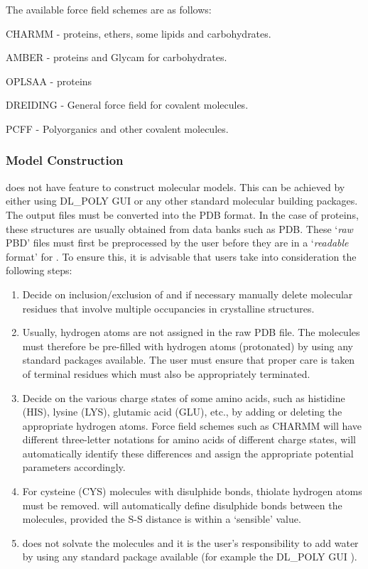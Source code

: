 The available force field schemes are as follows:

CHARMM - proteins, ethers, some lipids and carbohydrates.

AMBER - proteins and Glycam for carbohydrates.

OPLSAA - proteins

DREIDING - General force field for covalent molecules.

PCFF - Polyorganics and other covalent molecules.

\subsubsection*{Model Construction}

\F does not have feature to construct molecular models.  This can be
achieved by either using DL\_POLY GUI \cite{smith-gui} or any
other standard molecular building packages.  The output files must be
converted into the PDB format.  In the case of proteins, these structures
are usually obtained from data banks such as PDB.  These ‘{\em raw} PBD’
files must first be preprocessed by the user before they are in a
‘{\em readable} format’ for \F.  To ensure this, it is advisable that
users take into consideration the following steps:
\begin{enumerate}
\item Decide on inclusion/exclusion of and if necessary manually delete
molecular residues that involve multiple occupancies in crystalline structures.
\item Usually, hydrogen atoms are not assigned in the raw PDB file.
The molecules must therefore be pre-filled with hydrogen atoms (protonated)
by using any standard packages available.  The user must ensure that proper
care is taken of terminal residues which must also be appropriately terminated.
\item Decide on the various charge states of some amino acids, such as
histidine (HIS), lysine (LYS), glutamic acid (GLU), etc., by adding or
deleting the appropriate hydrogen atoms.  Force field schemes such as CHARMM
will have different three-letter notations for amino acids of different charge
states, \F will automatically identify these differences and assign the
appropriate potential parameters accordingly.
\item For cysteine (CYS) molecules with disulphide bonds, thiolate hydrogen
atoms must be removed.  \F will automatically define disulphide bonds between
the molecules, provided the S-S distance is within a ‘sensible’ value.
\item \F does not solvate the molecules and it is the user's responsibility
to add water by using any standard package available (for example the
DL\_POLY GUI \cite{smith-gui}).
\end{enumerate}

